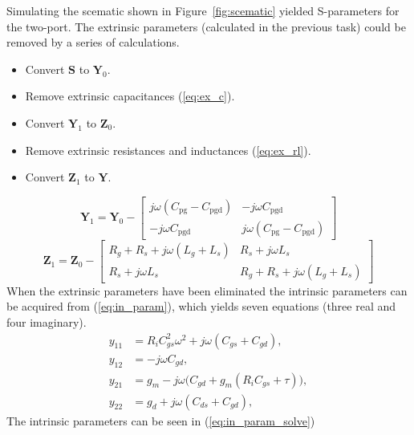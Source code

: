 \documentclass[12pt,a4paper]{article}
\begin{document}
Simulating the scematic shown in Figure~\ref{fig:scematic} yielded S-parameters for the two-port. The extrinsic parameters (calculated in the previous task) could be removed by a series of calculations.
\begin{itemize}
\item Convert $\mathbf{S}$ to $\mathbf{Y}_0$.
\item Remove extrinsic capacitances (\ref{eq:ex_c}).
\item Convert $\mathbf{Y}_1$ to $\mathbf{Z}_0$.
\item Remove extrinsic resistances and inductances (\ref{eq:ex_rl}).
\item Convert $\mathbf{Z}_1$ to $\mathbf{Y}$.
\end{itemize}
\begin{equation}
  \label{eq:ex_c}
  \mathbf{Y}_1 = \mathbf{Y}_0 -
  \begin{bmatrix}
    j\omega(C_\text{pg}-C_\text{pgd}) & -j\omega C_\text{pgd} \\
    -j\omega C_\text{pgd} & j\omega(C_\text{pg}-C_\text{pgd})
  \end{bmatrix}
\end{equation}
\begin{equation}
  \label{eq:ex_rl}
  \mathbf{Z}_1 = \mathbf{Z}_0 -
  \begin{bmatrix}
    R_g+R_s+j\omega(L_g+L_s) & R_s+j\omega L_s \\
    R_s+j\omega L_s & R_g+R_s+j\omega(L_g+L_s)
  \end{bmatrix}
\end{equation}
When the extrinsic parameters have been eliminated the intrinsic parameters can be acquired from (\ref{eq:in_param}), which yields seven equations (three real and four imaginary).
\begin{subequations}
  \label{eq:in_param}
  \begin{align}
    y_{11} &= R_iC_{gs}^2\omega^2+j\omega(C_{gs}+C_{gd}), \label{eq:in_param_y11}\\
    y_{12} &= -j\omega C_{gd}, \label{eq:in_param_y12}\\
    y_{21} &= g_m-j\omega\big(C_{gd}+g_m(R_iC_{gs}+\tau)\big), \label{eq:in_param_y21}\\
    y_{22} &= g_d+j\omega(C_{ds}+C_{gd}), \label{eq:in_param_y22}
  \end{align}
\end{subequations}
The intrinsic parameters can be seen in (\ref{eq:in_param_solve})
\end{document}
